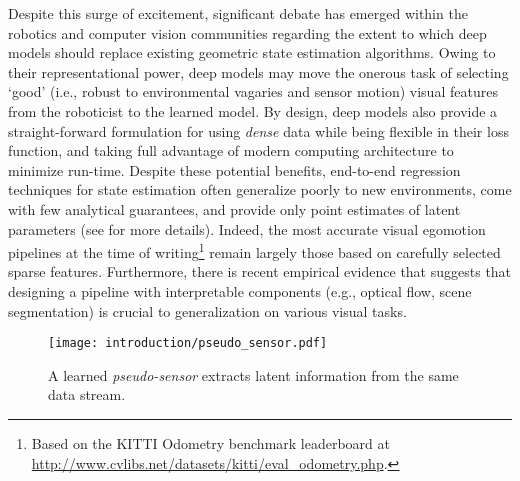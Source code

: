 Despite this surge of excitement, significant debate has emerged within the robotics and computer vision communities regarding the extent to which deep models should replace existing geometric state estimation algorithms. Owing to their representational power, deep models may move the onerous task of selecting `good' (i.e., robust to environmental vagaries and sensor motion) visual features from the roboticist to the learned model. By design, deep models also provide a straight-forward formulation for using \textit{dense} data while being flexible in their loss function, and taking full advantage of modern computing architecture to minimize run-time. Despite these potential benefits, end-to-end regression techniques for state estimation often generalize poorly to new environments, come with few analytical guarantees, and provide only point estimates of latent parameters (see  for more details). Indeed, the most accurate visual egomotion pipelines at the time of writing\footnote{Based on the KITTI Odometry benchmark leaderboard at \url{http://www.cvlibs.net/datasets/kitti/eval_odometry.php}.} remain largely those based on carefully selected sparse features. Furthermore, there is recent empirical evidence \citep{Zhou2019-se} that suggests that designing a pipeline with interpretable components (e.g., optical flow, scene segmentation) is crucial to generalization on various visual tasks. 

\begin{figure}
\begin{center}
		\texttt{[image: introduction/pseudo\_sensor.pdf]}
		\caption{A learned \textit{pseudo-sensor} extracts latent information from the same data stream.}
  	\label{fig:intro_pseudo_sensor}
\end{center}
\end{figure}


